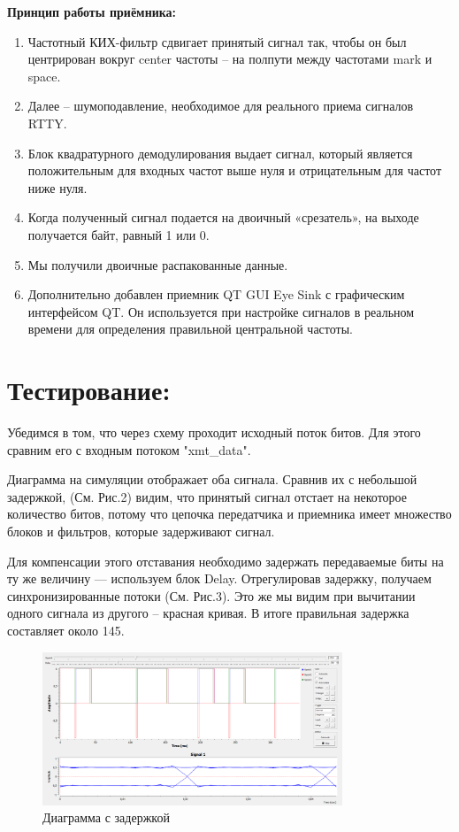 \documentclass[12pt]{article}
\begin{document}
\textbf{Принцип работы приёмника:}
\begin{enumerate}
	\item Частотный КИХ-фильтр сдвигает принятый сигнал так, чтобы он был центрирован вокруг center частоты – на полпути между частотами mark и space.
	\item Далее – шумоподавление, необходимое для реального приема сигналов RTTY.
	\item Блок квадратурного демодулирования выдает сигнал, который является положительным для входных частот выше нуля и отрицательным для частот ниже нуля. 
	\item Когда полученный сигнал подается на двоичный «срезатель», на выходе получается байт, равный 1 или 0. 
	\item Мы получили двоичные распакованные данные.
	\item Дополнительно добавлен приемник QT GUI Eye Sink с графическим интерфейсом QT. Он используется при настройке сигналов в реальном времени для определения правильной центральной частоты.
	\end{enumerate}

\section{Тестирование:}

Убедимся в том, что через схему проходит исходный поток битов. Для этого сравним его с входным потоком "xmt\_data". 

Диаграмма на симуляции отображает оба сигнала. Сравнив их с небольшой задержкой, (См. Рис.2) видим, что принятый сигнал отстает на некоторое количество битов, потому что цепочка передатчика и приемника имеет множество блоков и фильтров, которые задерживают сигнал. 

Для компенсации этого отставания необходимо задержать передаваемые биты на ту же величину --- используем блок Delay. Отрегулировав задержку, получаем синхронизированные потоки (См. Рис.3). Это же мы видим при вычитании одного сигнала из другого – красная кривая. В итоге правильная задержка составляет около 145.

\begin{figure}[H]
    \centering
    \includegraphics[width=0.8\textwidth]{pics/a0000-img002.png}
    \caption{Диаграмма с задержкой}
\end{figure}
\end{document}
